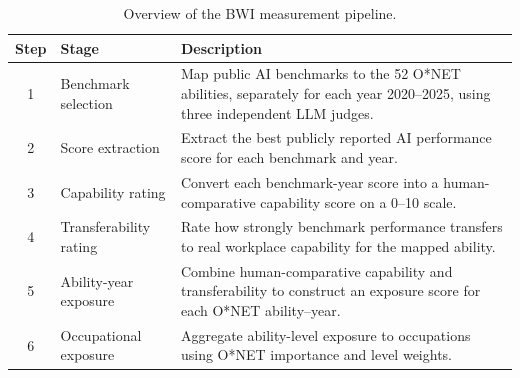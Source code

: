 \begin{table}[htbp]\centering
\caption{Overview of the BWI measurement pipeline.}\label{tab:pipeline}
\begin{tabular}{clp{9cm}}\toprule
Step & Stage & Description \\ \midrule
1 & Benchmark selection & Map public AI benchmarks to the 52 O*NET abilities, separately for each year 2020--2025, using three independent LLM judges. \\
2 & Score extraction & Extract the best publicly reported AI performance score for each benchmark and year. \\
3 & Capability rating & Convert each benchmark-year score into a human-comparative capability score on a 0--10 scale. \\
4 & Transferability rating & Rate how strongly benchmark performance transfers to real workplace capability for the mapped ability. \\
5 & Ability-year exposure & Combine human-comparative capability and transferability to construct an exposure score for each O*NET ability--year. \\
6 & Occupational exposure & Aggregate ability-level exposure to occupations using O*NET importance and level weights. \\
\bottomrule\end{tabular}\end{table}
